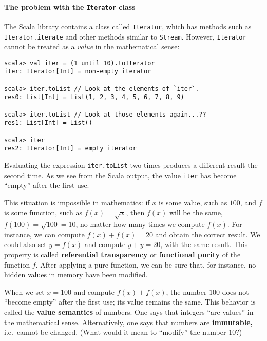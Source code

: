 \paragraph{The problem with the \texttt{Iterator} class}

The Scala library contains a class called \lstinline!Iterator!, which
has methods such as \lstinline!Iterator.iterate! and other methods
similar to \lstinline!Stream!. However, \lstinline!Iterator! cannot
be treated as a \emph{value} in the mathematical sense:
\begin{lstlisting}
scala> val iter = (1 until 10).toIterator
iter: Iterator[Int] = non-empty iterator

scala> iter.toList // Look at the elements of `iter`.
res0: List[Int] = List(1, 2, 3, 4, 5, 6, 7, 8, 9)

scala> iter.toList // Look at those elements again...??
res1: List[Int] = List()

scala> iter
res2: Iterator[Int] = empty iterator
\end{lstlisting}
Evaluating the expression \lstinline!iter.toList! two times produces
a different result the second time. As we see from the Scala output,
the value \lstinline!iter! has become ``empty'' after the first
use.

This situation is impossible in mathematics: if $x$ is some value,
such as $100$, and $f$ is some function, such as $f(x)=\sqrt{x}$,
then $f(x)$ will be the same, $f(100)=\sqrt{100}=10$, no matter
how many times we compute $f(x)$. For instance, we can compute $f(x)+f(x)=20$
and obtain the correct result. We could also set $y=f(x)$ and compute
$y+y=20$, with the same result. This property is called \textbf{referential
transparency} or \textbf{functional purity}
of the function $f$. After applying a pure function, we can be sure
that, for instance, no hidden values in memory have been modified.

When we set $x=100$ and compute $f(x)+f(x)$, the number $100$ does
not ``become empty'' after the first use; its value remains the
same. This behavior is called the \textbf{value
semantics} of numbers. One says that integers ``are values'' in
the mathematical sense. Alternatively, one says that numbers are \textbf{immutable,}
i.e.~cannot be changed. (What would it mean to ``modify'' the number
$10$?)

